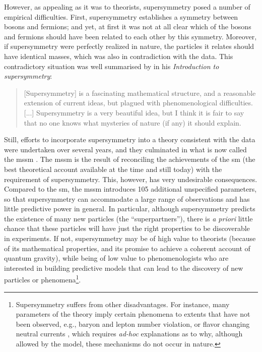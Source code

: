 \documentclass[smallextended]{svjour3}
\begin{document}
However, as appealing as it was to theorists, supersymmetry posed a number of empirical difficulties. First, supersymmetry establishes a symmetry between bosons and fermions; and yet, at first it was not  at all clear which of the bosons and fermions should have been related to each other by this symmetry. Moreover, if supersymmetry were perfectly realized in nature, the particles it relates should have identical masses, which was also in contradiction with the data. This contradictory situation was well summarised by \citet{Witten1982de} in his \textit{Introduction to supersymmetry}: 

\begin{quote}
    [Supersymmetry] is a fascinating mathematical structure, and a reasonable extension of current ideas, but plagued with phenomenological difficulties. [...] Supersymmetry is a very beautiful idea, but I think it is fair to say that no one knows what mysteries of nature (if any) it should explain.
\end{quote}

Still, efforts to incorporate supersymmetry into a theory consistent with the data were undertaken over several years, and they culminated in what is now called the \gls{mssm} \citep{Fayet1976cr,Dimopoulos1981}. The \gls{mssm} is the result of reconciling the achievements of the \gls{sm} (the best theoretical account available at the time and still today) with the requirement of supersymmetry. This, however, has very undesirable consequences. Compared to the \gls{sm}, the \gls{mssm} introduces 105 additional unspecified parameters, so that supersymmetry can accommodate a large range of observations and has little predictive power in general. In particular, although supersymmetry predicts the existence of many new particles (the ``superpartners''), there is \textit{a priori} little chance  that these particles will have just the right properties to be discoverable in experiments. If not, supersymmetry may be of high value to theorists (because of its mathematical properties, and its promise to achieve a coherent account of quantum gravity), while being of low value to phenomenologists who are interested in building predictive models that can lead to the discovery of new particles or phenomena\footnote{Supersymmetry suffers from other disadvantages. For instance, many parameters of the theory imply certain phenomena to extents that have not been observed, e.g., baryon and lepton number violation, or flavor changing neutral currents \citep{weinberg1995the}, which requires \textit{ad-hoc} explanations as to why, although allowed by the model, these mechanisms do not occur in nature.}.
\end{document}

